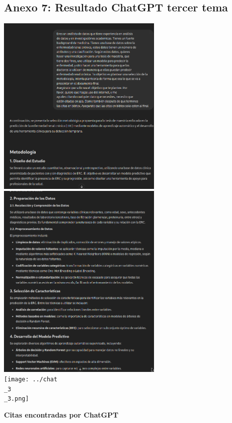 \documentclass{article}
\begin{document}
\subsection{Anexo 7: Resultado ChatGPT tercer tema}
\begin{center}
    \includegraphics[width=0.6\textwidth]{../chat_1_3.png}\\
    \includegraphics[width=0.6\textwidth]{../chat_2_3.png}\\
    \newpage
    \texttt{[image: ../chat\\\_3\\\_3.png]}\\
\end{center}
\textbf{Citas encontradas por ChatGPT}
\end{document}
